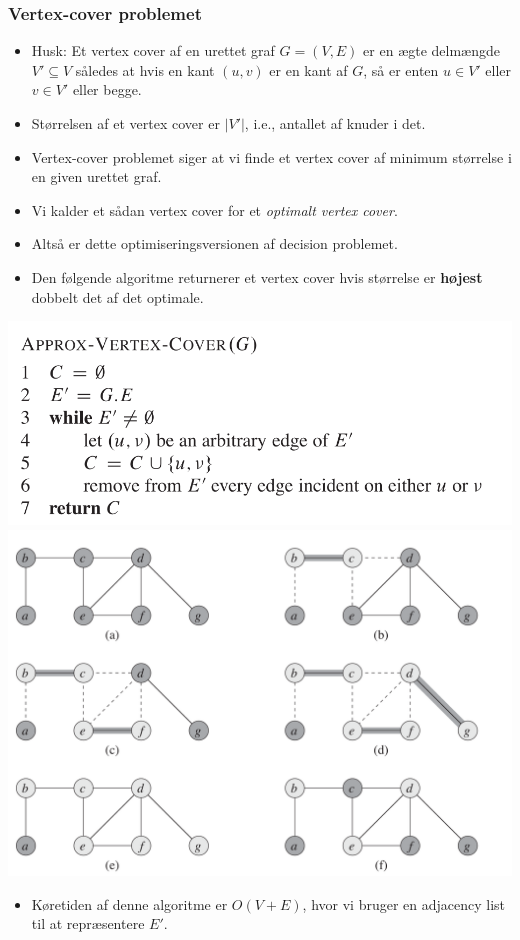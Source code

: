 \begin{frame}[allowframebreaks]
	\frametitle{Vertex-cover problemet}
	\begin{itemize}
		\item Husk: Et vertex cover af en urettet graf $G = (V,E)$ er en ægte delmængde $V' \subseteq V$ således at hvis en kant $(u,v)$ er en kant af $G$, så er enten $u \in V'$ eller $v \in V'$ eller begge.
		\item Størrelsen af et vertex cover er $|V'|$, i.e., antallet af knuder i det.
		\item Vertex-cover problemet siger at vi finde et vertex cover af minimum størrelse i en given urettet graf.
		\item Vi kalder et sådan vertex cover for et \textit{optimalt vertex cover}.
		\item Altså er dette optimiseringsversionen af decision problemet.
		\item Den følgende algoritme returnerer et vertex cover hvis størrelse er \textbf{højest} dobbelt det af det optimale.
	\end{itemize}
	\begin{center}
		\includegraphics[scale=0.45]{figur/approxvertexcover.png}
		\includegraphics[scale=0.35]{figur/figur3501.png}
	\end{center}
	\begin{itemize}
		\item Køretiden af denne algoritme er $O(V+E)$, hvor vi bruger en adjacency list til at repræsentere $E'$.
	\end{itemize}


\end{frame}
